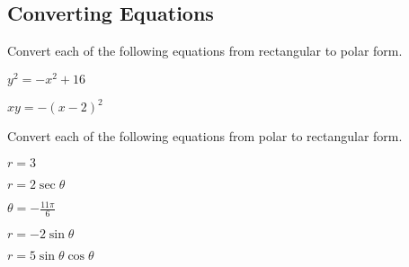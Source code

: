 \documentclass{exam}
\begin{document}
\newpage

\subsection*{Converting Equations}
\noindent Convert each of the following equations from rectangular to polar form.
\begin{questions}
    \begin{minipage}{.45\linewidth}
        \question $y^2=-x^2+16$    
    \end{minipage}
    \hfill
    \begin{minipage}{.45\linewidth}
        \question $xy=-(x-2)^2$    
    \end{minipage}


\end{questions}

\noindent Convert each of the following equations from polar to rectangular form.
\begin{questions}
    \begin{minipage}{.45\linewidth}
        \question $r=3$    
    \end{minipage}
    \hfill
    \begin{minipage}{.45\linewidth}
        \question $r=2\sec\theta$    
    \end{minipage}


    \begin{minipage}{.45\linewidth}
        \question $\theta=-\frac{11\pi}{6}$    
    \end{minipage}
    \hfill
    \begin{minipage}{.45\linewidth}
        \question $r=-2\sin\theta$    
    \end{minipage}


    \begin{minipage}{.45\linewidth}
        \question $r=5\sin\theta\cos\theta$
    \end{minipage}
    \hfill
    \begin{minipage}{.45\linewidth}
            
    \end{minipage}


    
\end{questions}
\end{document}
